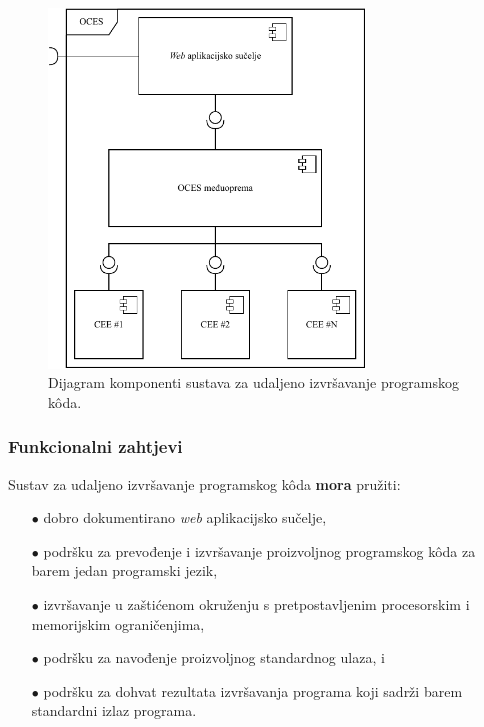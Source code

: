 \documentclass[times, utf8, diplomski]{fer}
\begin{document}
\begin{figure}[htb]
	\centering
	\includegraphics[width=0.75\textwidth]{images/Arhitektura OCES-a.pdf}
	\caption{
	    Dijagram komponenti sustava za udaljeno izvršavanje programskog kôda.
	}
	\label{fig:oces-architecture}
\end{figure}

\pagebreak

\subsubsection{Funkcionalni zahtjevi}
Sustav za udaljeno izvršavanje programskog kôda \textbf{mora} pružiti:
\begin{itemize}
    \item[$\bullet$] dobro dokumentirano \textit{web} aplikacijsko sučelje,
    \item[$\bullet$] podršku za prevođenje i izvršavanje proizvoljnog programskog kôda za barem jedan programski jezik,
    \item[$\bullet$] izvršavanje u zaštićenom okruženju s pretpostavljenim procesorskim i memorijskim ograničenjima,
    \item[$\bullet$] podršku za navođenje proizvoljnog standardnog ulaza, i
    \item[$\bullet$] podršku za dohvat rezultata izvršavanja programa koji sadrži barem standardni izlaz programa.
\end{itemize}
\end{document}
